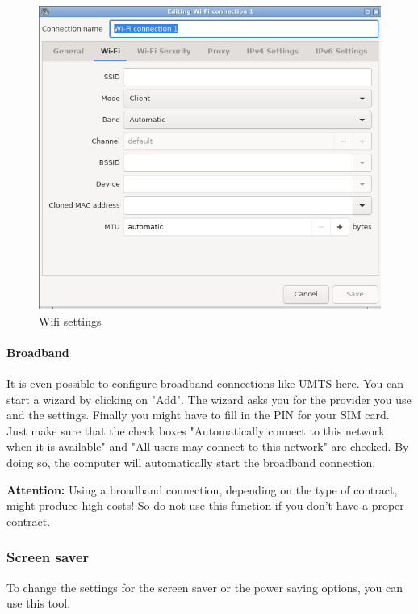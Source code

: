 \documentclass[a4paper,12pt,twoside]{article}
\begin{document}
\begin{figure}
    \centering
    \includegraphics[width=13cm]{screenshots/network_manager_wifi.png}
    \caption{Wifi settings}
    \label{fig:wifi}
\end{figure}


\paragraph{Broadband}
\label{sct:broadband}
It is even possible to configure broadband connections like UMTS here.
You can start a wizard by clicking on
"Add". The wizard asks you for the provider
you use and the settings. Finally you might have to fill in the PIN for
your SIM card. Just make sure that the check boxes "Automatically connect 
to this network when it is available" and "All users may connect to this 
network" are checked. By doing so, the computer will automatically start 
the broadband connection.

\bigskip
\textbf{Attention:} Using a broadband connection, depending on the type of
contract, might produce high costs! So do not use this function if you
don't have a proper contract.
\bigskip

\subsubsection{Screen saver}
\label{sct:screen_saver}
To change the settings for the screen saver or the power saving options,
you can use this tool.
\end{document}
